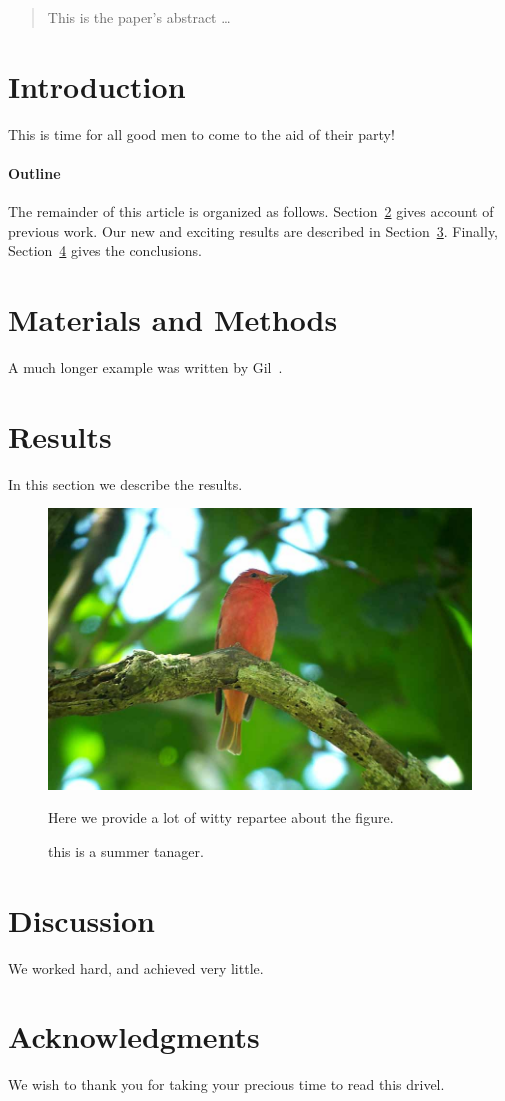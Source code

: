 \documentclass[12pt]{article}
\begin{document}
\maketitle

\begin{abstract}
This is the paper's abstract \ldots
\end{abstract}

\section{Introduction}
This is time for all good men to come to the aid of their party!

\paragraph{Outline}
The remainder of this article is organized as follows.
Section~\ref{previous work} gives account of previous work.
Our new and exciting results are described in Section~\ref{results}.
Finally, Section~\ref{conclusions} gives the conclusions.

\section{Materials and Methods}
\label{previous work}
A much longer \LaTeXe{} example was written by Gil~\cite{Gil:02}.

\section{Results}
\label{results}
In this section we describe the results.

\begin{figure}
\includegraphics{summer_tanager_3_B.jpg}
\caption{this is a summer tanager.}
Here we provide a lot of witty repartee about the figure.
\end{figure}

\section{Discussion}
\label{conclusions}
We worked hard, and achieved very little.

\section{Acknowledgments}
We wish to thank you for taking your precious time to read this drivel.



\end{document}
